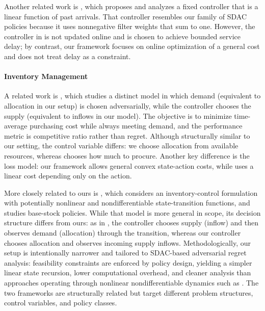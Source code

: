 \documentclass[11pt]{article}
\begin{document}
Another related work is \cite{khojastepour2004delay}, which proposes and analyzes a fixed controller that is a linear function of past arrivals. That controller resembles our family of SDAC policies because it uses nonnegative filter weights that sum to one. However, the controller in \cite{khojastepour2004delay} is not updated online and is chosen to achieve bounded service delay; by contrast, our framework focuses on online optimization of a general cost and does not treat delay as a constraint.

\paragraph{Inventory Management}

A related work is \cite{yang2020online}, which studies a distinct model in which demand (equivalent to allocation in our setup) is chosen adversarially, while the controller chooses the supply (equivalent to inflows in our model). The objective is to minimize time-average purchasing cost while always meeting demand, and the performance metric is competitive ratio rather than regret. Although structurally similar to our setting, the control variable differs: we choose allocation from available resources, whereas \cite{yang2020online} chooses how much to procure. Another key difference is the loss model: our framework allows general convex state-action costs, while \cite{yang2020online} uses a linear cost depending only on the action.


More closely related to ours is \cite{hihat2024online}, which considers an inventory-control formulation with potentially nonlinear and nondifferentiable state-transition functions, and studies base-stock policies. While that model is more general in scope, its decision structure differs from ours: as in \cite{yang2020online}, the controller chooses supply (inflow) and then observes demand (allocation) through the transition, whereas our controller chooses allocation and observes incoming supply inflows. Methodologically, our setup is intentionally narrower and tailored to SDAC-based adversarial regret analysis: feasibility constraints are enforced by policy design, yielding a simpler linear state recursion, lower computational overhead, and cleaner analysis than approaches operating through nonlinear nondifferentiable dynamics such as \cite{hihat2024online}. The two frameworks are structurally related but target different problem structures, control variables, and policy classes.
\end{document}
